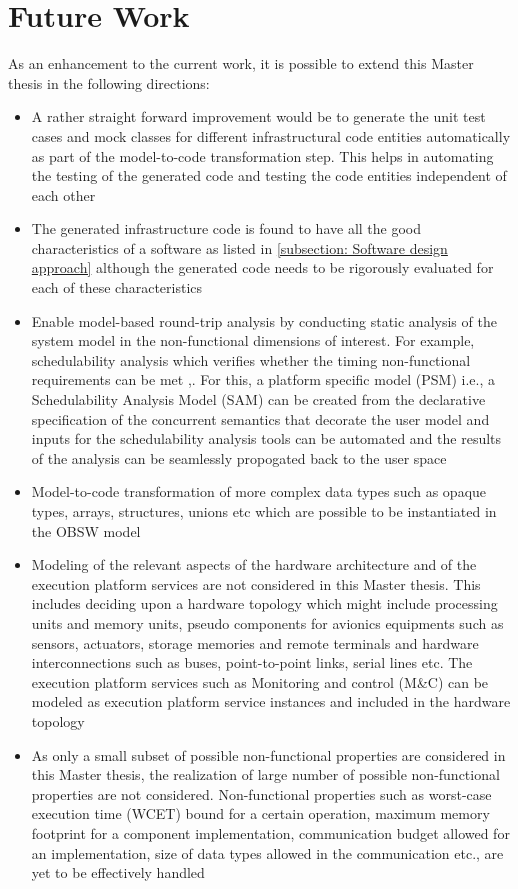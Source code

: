 \section{Future Work}
As an enhancement to the current work, it is possible to extend this Master thesis in the following directions:
\begin{itemize}
\item A rather straight forward improvement would be to generate the unit test cases and mock classes for different infrastructural code entities automatically as part of the model-to-code transformation step. This helps in automating the testing of the generated code and testing the code entities independent of each other
\item The generated infrastructure code is found to have all the good characteristics of a software as listed in \cref{subsection: Software design approach} although the generated code needs to be rigorously evaluated for each of these characteristics 
\item Enable model-based round-trip analysis by conducting static analysis of the system model in the non-functional dimensions of interest. For example, schedulability analysis which verifies whether the timing non-functional requirements can be met \cite{ScheduAnaly},\cite{CompBasedProcess}.  For this, a platform specific model (PSM) i.e., a Schedulability Analysis Model (SAM) can be created from the declarative specification of the concurrent semantics that decorate the user model and inputs for the schedulability analysis tools can be automated and the results of the analysis can be seamlessly propogated back to the user space \cite{ScheduAnaly}
\item Model-to-code transformation of more complex data types such as opaque types, arrays, structures, unions etc which are possible to be instantiated in the OBSW model
\item Modeling of the relevant aspects of the hardware architecture and of the execution platform services are not considered in this Master thesis. This includes deciding upon a hardware topology which might include processing units and memory units, pseudo components for avionics equipments such as sensors, actuators, storage memories and remote terminals and hardware interconnections such as buses, point-to-point links, serial lines etc. The execution platform services such as Monitoring and control (M\&C) can be modeled as execution platform service instances and included in the hardware topology  
\item As only a small subset of possible non-functional properties are considered in this Master thesis, the realization of large number of possible non-functional properties are not considered. Non-functional properties such as worst-case execution time (WCET) bound for a certain operation, maximum memory footprint for a component implementation, communication budget allowed for an implementation, size of data types allowed in the communication etc., are yet to be effectively handled

\end{itemize}
